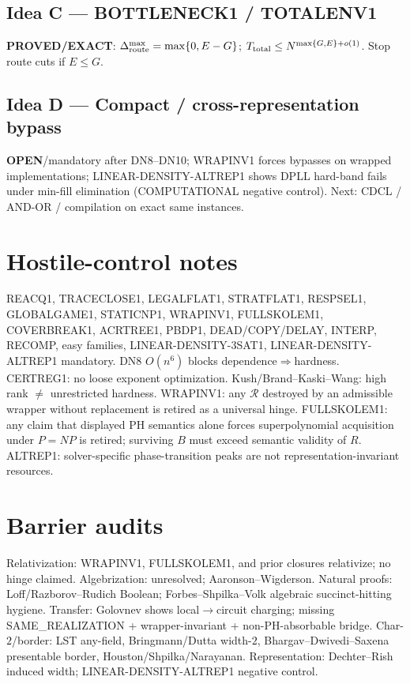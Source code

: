 \documentclass[11pt]{article}
\begin{document}
\subsection*{Idea C --- BOTTLENECK1 / TOTALENV1}
\textbf{PROVED/EXACT}: $\Delta_{\rm route}^{\max}=\max\{0,E-G\}$;
$T_{\rm total}\le N^{\max\{G,E\}+o(1)}$. Stop route cuts if $E\le G$.

\subsection*{Idea D --- Compact / cross-representation bypass}
\textbf{OPEN}/mandatory after DN8--DN10; WRAPINV1 forces bypasses on wrapped implementations;
LINEAR-DENSITY-ALTREP1 shows DPLL hard-band fails under min-fill elimination (COMPUTATIONAL
negative control). Next: CDCL / AND-OR / compilation on exact same instances.

\section*{Hostile-control notes}
REACQ1, TRACECLOSE1, LEGALFLAT1, STRATFLAT1, RESPSEL1, GLOBALGAME1, STATICNP1, WRAPINV1,
FULLSKOLEM1, COVERBREAK1, ACRTREE1, PBDP1, DEAD/COPY/DELAY, INTERP, RECOMP, easy families,
LINEAR-DENSITY-3SAT1, LINEAR-DENSITY-ALTREP1 mandatory.
DN8 $O(n^6)$ blocks dependence$\Rightarrow$hardness. CERTREG1: no loose exponent optimization.
Kush/Brand--Kaski--Wang: high rank $\neq$ unrestricted hardness.
WRAPINV1: any $\mathcal R$ destroyed by an admissible wrapper without replacement is retired
as a universal hinge.
FULLSKOLEM1: any claim that displayed PH semantics alone forces superpolynomial acquisition
under $P=NP$ is retired; surviving $B$ must exceed semantic validity of $R$.
ALTREP1: solver-specific phase-transition peaks are not representation-invariant resources.

\section*{Barrier audits}
Relativization: WRAPINV1, FULLSKOLEM1, and prior closures relativize; no hinge claimed.
Algebrization: unresolved; Aaronson--Wigderson. Natural proofs: Loff/Razborov--Rudich Boolean;
Forbes--Shpilka--Volk algebraic succinct-hitting hygiene. Transfer: Golovnev shows
local$\to$circuit charging; missing SAME\_REALIZATION + wrapper-invariant + non-PH-absorbable
bridge. Char-$2$/border: LST any-field, Bringmann/Dutta width-$2$, Bhargav--Dwivedi--Saxena
presentable border, Houston/Shpilka/Narayanan. Representation: Dechter--Rish induced width;
LINEAR-DENSITY-ALTREP1 negative control.
\end{document}
